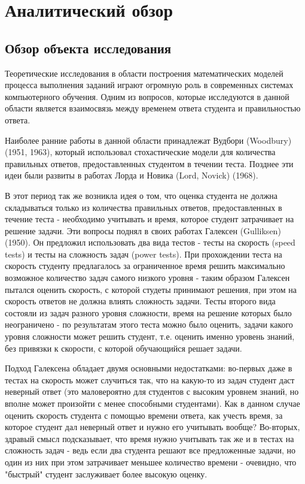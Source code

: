 \chapter{Аналитический обзор}
\label{mainpart} 
\section{Обзор объекта исследования}

Теоретические исследования в области построения математических моде\-лей процесса выполнения заданий играют огромную роль в современных системах компьютерного обучения. Одним из
вопросов, которые исследуются в данной области является взаимосвязь между временем ответа студента и правильностью ответа.

Наиболее ранние работы в данной области принадлежат Вудбори (Woodbury) (1951, 1963), который использовал стохастические модели для коли\-чества правильных ответов, предоставленных студентом в течении теста. Поз\-днее эти идеи были развиты в работах  Лорда и Новика (Lord, Novick) (1968).

В этот период так же возникла идея о том, что оценка студента не должна складываться только из количества правильных ответов, предоставленных в течение теста - необходимо учитывать и время, которое студент затрачивает на решение задачи. Эти вопросы поднял в своих работах Галексен (Gulliksen) (1950). Он предложил использовать два вида тестов - тесты на скорость (speed tests) и тесты на сложность задач (power tests). При прохождении теста на скорость студенту предлагалось за ограни\-ченное время решить макси\-мально возможное количество задач самого низ\-кого уровня - таким образом Галексен пытался оценить скорость, с которой студеты принимают решения, при этом на скорость ответов не должна влиять сложность задачи. Тесты второго вида состояли из задач разного уровня сложности, время на решение которых было неограничено - по результатам этого теста можно было оценить, задачи какого уровня сложности может решить студент, т.е. оценить именно уровень знаний, без привязки к скорости, с которой обучающийся решает задачи.

 Подход Галексена обладает двумя основными недостатками: во-первых даже в тестах на скорость может случиться так, что на какую-то из задач студент даст неверный ответ (это маловероятно для студентов с высоким уровнем знаний, но вполне может произойти с менее способными студентами). Как в данном случае оценить скорость студента с помощью времени ответа, как учесть время, за которое студент дал неверный ответ и нужно его учиты\-вать вообще? Во-вторых, здравый смысл подсказывает, что время нужно учитывать так же и в тестах на сложность задач - ведь если два студента решают все предложенные задачи, но один из них при этом затрачивает меньшее количество времени - очевидно, что "быстрый" студент заслуживает более высокую оценку.

